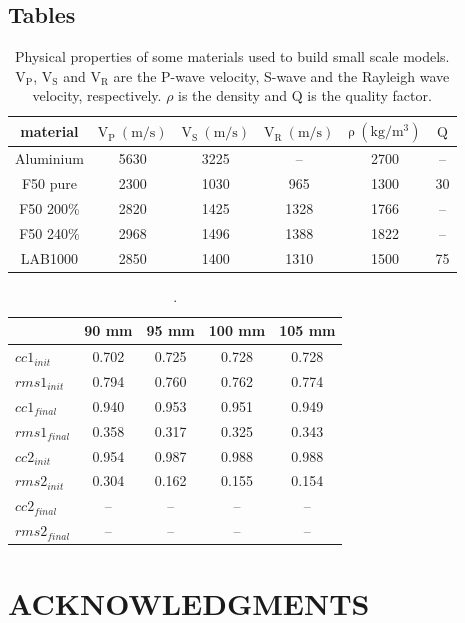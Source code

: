 \documentclass[manuscript,revised]{geophysics}
\begin{document}
\clearpage
\newpage

\subsection*{Tables}

\begin{table}[!ht]
	\centering
	\begin{tabular}{cccccc}
		\hline
		material & $\mathrm{V_{P}\ (m/s)}$ & $\mathrm{V_{S}\ (m/s)}$ & $\mathrm{V_{R}\ (m/s)}$ & $\mathrm{\rho\ (kg/m^{3})}$ & $\mathrm{Q}$ \\
		\hline
		Aluminium & 5630 & 3225 & --   & 2700 & --  \\
		F50 pure  & 2300 & 1030 & 965  & 1300 & 30  \\
		F50 200\% & 2820 & 1425 & 1328 & 1766 & --  \\
		F50 240\% & 2968 & 1496 & 1388 & 1822 & --  \\
		LAB1000   & 2850 & 1400 & 1310 & 1500 & 75  \\
		\hline
	\end{tabular}
	\caption{Physical properties of some materials used to build small scale models. $\mathrm{V_{P}}$, $\mathrm{V_{S}}$ and $\mathrm{V_{R}}$ are the P-wave velocity, S-wave and the Rayleigh wave velocity, respectively. $\rho$ is the density and $\mathrm{Q}$ is the quality factor.}
	\label{epoxy-resin}
\end{table}

\clearpage
\newpage

\begin{table}[!ht]
	\centering
	\begin{tabular}{lcccc}
		\hline
		\qquad & 90 mm & 95 mm & 100 mm & 105 mm \\
		\hline
		$cc1_{init}$  & 0.702 & 0.725 & 0.728 & 0.728 \\
		$rms1_{init}$ & 0.794 & 0.760 & 0.762 & 0.774 \\
		\hline
		$cc1_{final}$  & 0.940 & 0.953 & 0.951 & 0.949 \\
		$rms1_{final}$ & 0.358 & 0.317 & 0.325 & 0.343 \\
		\hline
		\hline
		$cc2_{init}$  & 0.954 & 0.987 & 0.988 & 0.988 \\
		$rms2_{init}$ & 0.304 & 0.162 & 0.155 & 0.154 \\
		\hline
		$cc2_{final}$  & --   & --    & --    & --    \\
		$rms2_{final}$ & --   & --    & --    & --    \\
		\hline
	\end{tabular}
	\caption{.}
	\label{cc-rms}
\end{table}

\clearpage
\newpage 

\section{ACKNOWLEDGMENTS}

\clearpage
\newpage

%

\end{document}
